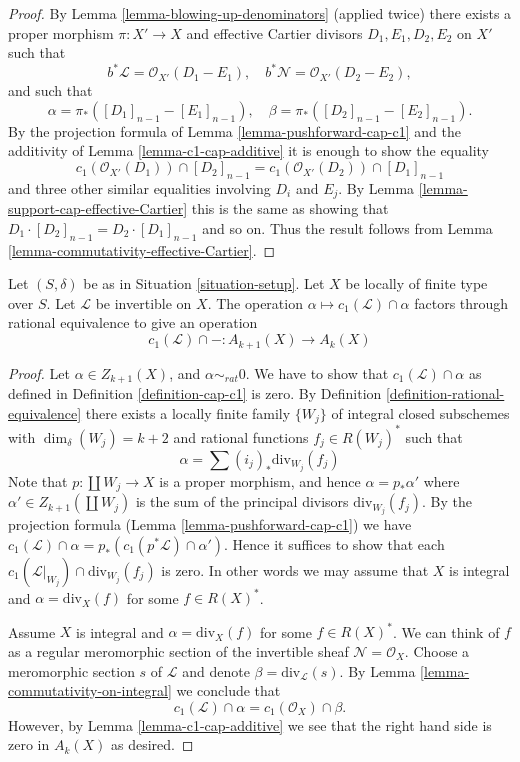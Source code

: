 \begin{proof}
By Lemma \ref{lemma-blowing-up-denominators} (applied twice)
there exists a proper morphism
$\pi : X' \to X$ and effective Cartier divisors
$D_1, E_1, D_2, E_2$ on $X'$ such that
$$
b^*\mathcal{L} = \mathcal{O}_{X'}(D_1 - E_1),
\quad
b^*\mathcal{N} = \mathcal{O}_{X'}(D_2 - E_2),
$$
and such that
$$
\alpha = \pi_*([D_1]_{n - 1} - [E_1]_{n - 1}),
\quad
\beta = \pi_*([D_2]_{n - 1} - [E_2]_{n - 1}).
$$
By the projection formula of Lemma \ref{lemma-pushforward-cap-c1}
and the additivity of Lemma \ref{lemma-c1-cap-additive}
it is enough to show the equality
$$
c_1(\mathcal{O}_{X'}(D_1)) \cap [D_2]_{n - 1}
=
c_1(\mathcal{O}_{X'}(D_2)) \cap [D_1]_{n - 1}
$$
and three other similar equalities involving $D_i$ and $E_j$.
By Lemma \ref{lemma-support-cap-effective-Cartier} this is the
same as showing that
$D_1 \cdot [D_2]_{n - 1} = D_2 \cdot [D_1]_{n - 1}$ and so on.
Thus the result follows from Lemma \ref{lemma-commutativity-effective-Cartier}.
\end{proof}

\begin{lemma}
\label{lemma-factors}
Let $(S, \delta)$ be as in Situation \ref{situation-setup}.
Let $X$ be locally of finite type over $S$.
Let $\mathcal{L}$ be invertible on $X$.
The operation $\alpha \mapsto c_1(\mathcal{L}) \cap \alpha$
factors through rational equivalence to give an operation
$$
c_1(\mathcal{L}) \cap - : A_{k + 1}(X) \to A_k(X)
$$
\end{lemma}

\begin{proof}
Let $\alpha \in Z_{k + 1}(X)$, and $\alpha \sim_{rat} 0$.
We have to show that $c_1(\mathcal{L}) \cap \alpha$
as defined in Definition \ref{definition-cap-c1} is zero.
By Definition \ref{definition-rational-equivalence} there
exists a locally finite family $\{W_j\}$ of integral closed
subschemes with $\dim_\delta(W_j) = k + 2$ and rational functions
$f_j \in R(W_j)^*$ such that
$$
\alpha = \sum (i_j)_*\text{div}_{W_j}(f_j)
$$
Note that $p : \coprod W_j \to X$ is a proper morphism,
and hence $\alpha = p_*\alpha'$ where $\alpha' \in Z_{k + 1}(\coprod W_j)$
is the sum of the principal divisors $\text{div}_{W_j}(f_j)$.
By the projection formula (Lemma \ref{lemma-pushforward-cap-c1}) we have
$c_1(\mathcal{L}) \cap \alpha = p_*(c_1(p^*\mathcal{L}) \cap \alpha')$.
Hence it suffices to show that each
$c_1(\mathcal{L}|_{W_j}) \cap \text{div}_{W_j}(f_j)$ is zero.
In other words we may assume that $X$ is integral and
$\alpha = \text{div}_X(f)$ for some $f \in R(X)^*$.

\medskip\noindent
Assume $X$ is integral and $\alpha = \text{div}_X(f)$ for some $f \in R(X)^*$.
We can think of $f$ as a regular meromorphic section of the invertible
sheaf $\mathcal{N} = \mathcal{O}_X$. Choose a meromorphic section
$s$ of $\mathcal{L}$ and denote $\beta = \text{div}_\mathcal{L}(s)$.
By Lemma \ref{lemma-commutativity-on-integral}
we conclude that
$$
c_1(\mathcal{L}) \cap \alpha = c_1(\mathcal{O}_X) \cap \beta.
$$
However, by Lemma \ref{lemma-c1-cap-additive} we see that the right hand side
is zero in $A_k(X)$ as desired.
\end{proof}

